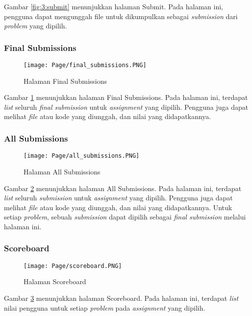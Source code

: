     Gambar \ref{fig:3:submit} menunjukkan halaman Submit. Pada halaman ini, pengguna dapat mengunggah file untuk dikumpulkan sebagai \textit{submission} dari \textit{problem} yang dipilih.

\subsubsection{Final Submissions}
    \begin{figure}[H]
    	\centering  
    	\texttt{[image: Page/final\_submissions.PNG]}  
    	\caption{Halaman Final Submissions}
    	\label{fig:3:final_submissions} 
    \end{figure} 
    
    Gambar \ref{fig:3:final_submissions} menunjukkan halaman Final Submissions. Pada halaman ini, terdapat \textit{list} seluruh \textit{final submission} untuk \textit{assignment} yang dipilih. Pengguna juga dapat melihat \textit{file} atau kode yang diunggah, dan nilai yang didapatkannya.
    
\subsubsection{All Submissions}
    \begin{figure}[H]
    	\centering  
    	\texttt{[image: Page/all\_submissions.PNG]}  
    	\caption{Halaman All Submissions}
    	\label{fig:3:all_submissions} 
    \end{figure} 
    
    Gambar \ref{fig:3:all_submissions} menunjukkan halaman All Submissions. Pada halaman ini, terdapat \textit{list} seluruh \textit{submission} untuk \textit{assignment} yang dipilih. Pengguna juga dapat melihat \textit{file} atau kode yang diunggah, dan nilai yang didapatkannya. Untuk setiap \textit{problem}, sebuah \textit{submission} dapat dipilih sebagai \textit{final submission} melalui halaman ini.
    
\subsubsection{Scoreboard}
    \begin{figure}[H]
    	\centering  
    	\texttt{[image: Page/scoreboard.PNG]}  
    	\caption{Halaman Scoreboard}
    	\label{fig:3:scoreboard} 
    \end{figure} 
    
    Gambar \ref{fig:3:scoreboard} menunjukkan halaman Scoreboard. Pada halaman ini, terdapat \textit{list} nilai pengguna untuk setiap \textit{problem} pada \textit{assignment} yang dipilih.
    
